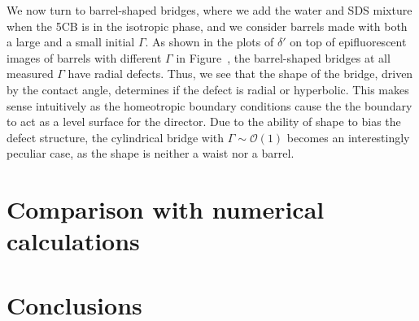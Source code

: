 We now turn to barrel-shaped bridges, where we add the water and SDS mixture when the 5CB is in the isotropic phase, and we consider barrels made with both a large and a small initial $\Gamma$.
As shown in the plots of $\delta'$ on top of epifluorescent images of barrels with different $\Gamma$ in Figure~, the barrel-shaped bridges at all measured $\Gamma$ have radial defects.
Thus, we see that the shape of the bridge, driven by the contact angle, determines if the defect is radial or hyperbolic.
This makes sense intuitively as the homeotropic boundary conditions cause the the boundary to act as a level surface for the director.
Due to the ability of shape to bias the defect structure, the cylindrical bridge with $\Gamma \sim \mathcal{O}\left (1 \right )$ becomes an interestingly peculiar case, as the shape is neither a waist nor a barrel.




\section{Comparison with numerical calculations}

\section{Conclusions}
